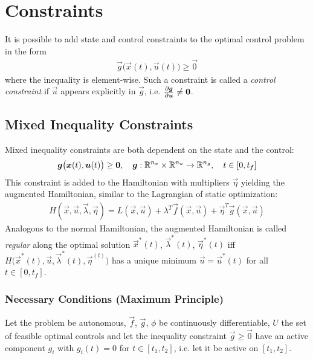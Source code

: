 	\section{Constraints}
		It is possible to add state and control constraints to the optimal control problem in the form
		\begin{align*}
			\vec{g}\big(\vec{x}(t), \vec{u}(t)\big) \geq \vec{0}
		\end{align*}
		where the inequality is element-wise. Such a constraint is called a \emph{control constraint} if \(\vec{u}\) appears explicitly in \(\vec{g}\), i.e. \( \pdv{\bm{g}}{\bm{u}} \neq \bm{0} \).

		\subsection{Mixed Inequality Constraints}
			Mixed inequality constraints are both dependent on the state and the control:
			\begin{align*}
				\bm{g}\big(\bm{x}(t), \bm{u}(t)\big) \geq \bm{0},\quad \bm{g} : \mathbb{R}^{n_x} \times \mathbb{R}^{n_u} \to \mathbb{R}^{n_g},\quad t \in [0, t_f]
			\end{align*}
			This constraint is added to the Hamiltonian with multipliers \( \vec{\eta} \) yielding the augmented Hamiltonian, similar to the Lagrangian of static optimization:
			\begin{align*}
				H(\vec{x}, \vec{u}, \vec{\lambda}, \vec{\eta}) = L(\vec{x}, \vec{u}) + \lambda^T \vec{f}(\vec{x}, \vec{u}) + \vec{\eta}^T \vec{g}(\vec{x}, \vec{u})
			\end{align*}
			Analogous to the normal Hamiltonian, the augmented Hamiltonian is called \emph{regular} along the optimal solution \( \vec{x}^\ast(t) \), \( \vec{\lambda}^\ast(t) \), \( \vec{\eta}^\ast(t) \) iff \( H\big( \vec{x}^\ast(t), \vec{u}, \vec{\lambda}^\ast(t), \vec{\eta}^(t) \big) \) has a unique minimum \( \vec{u} = \vec{u}^\ast(t) \) for all \( t \in [0, t_f] \).

			\subsubsection{Necessary Conditions (Maximum Principle)}
				Let the problem be autonomous, \(\vec{f}\), \(\vec{g}\), \(\phi\) be continuously differentiable, \(U\) the set of feasible optimal controls and let the inequality constraint \( \vec{g} \geq \vec{0} \) have an active component \( g_i \) with \( g_i(t) = 0 \) for \( t \in [t_1, t_2] \), i.e. let it be active on \( [t_1, t_2] \).

